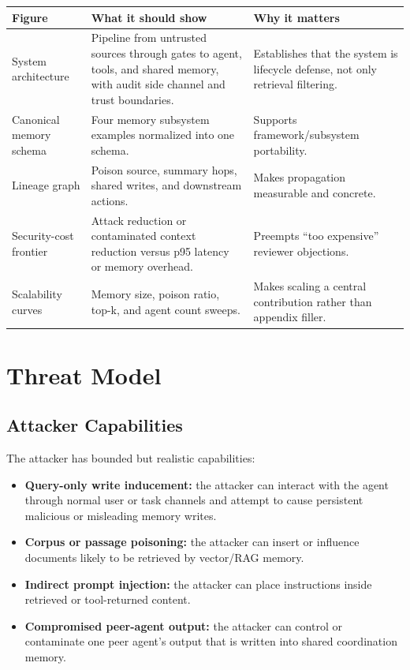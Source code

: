\documentclass[11pt,oneside]{report}
\begin{document}
\begin{longtable}{|L{0.22\textwidth}|L{0.36\textwidth}|L{0.32\textwidth}|}
\hline
\textbf{Figure} & \textbf{What it should show} & \textbf{Why it matters} \\
\hline
System architecture & Pipeline from untrusted sources through gates to agent, tools, and shared
memory, with audit side channel and trust boundaries. & Establishes that the system is lifecycle
defense, not only retrieval filtering. \\
\hline
Canonical memory schema & Four memory subsystem examples normalized into one schema. & Supports
framework/subsystem portability. \\
\hline
Lineage graph & Poison source, summary hops, shared writes, and downstream actions. & Makes
propagation measurable and concrete. \\
\hline
Security-cost frontier & Attack reduction or contaminated context reduction versus p95 latency or
memory overhead. & Preempts ``too expensive'' reviewer objections. \\
\hline
Scalability curves & Memory size, poison ratio, top-k, and agent count sweeps. & Makes scaling a
central contribution rather than appendix filler. \\
\hline
\end{longtable}

\chapter{Threat Model}

\section{Attacker Capabilities}

The attacker has bounded but realistic capabilities:

\begin{itemize}
  \item \textbf{Query-only write inducement:} the attacker can interact with the agent through normal
        user or task channels and attempt to cause persistent malicious or misleading memory writes.
  \item \textbf{Corpus or passage poisoning:} the attacker can insert or influence documents likely
        to be retrieved by vector/RAG memory.
  \item \textbf{Indirect prompt injection:} the attacker can place instructions inside retrieved or
        tool-returned content.
  \item \textbf{Compromised peer-agent output:} the attacker can control or contaminate one peer
        agent's output that is written into shared coordination memory.
\end{itemize}
\end{document}

